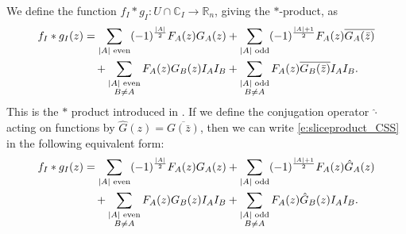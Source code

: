 \documentclass[11pt]{amsart}
\begin{document}
We define the function $f_I * g_I : U \cap \mathbb{C}_I \to \mathbb{R}_n$, giving the $\ast$-product, as
\begin{align}
f_I * g_I(z) &= \sum_{|A| \text{ even}} (-1)^{\frac{|A|}{2}} F_A(z) G_A(z) + \sum_{|A| \text{ odd}} (-1)^{\frac{|A|+1}{2}} F_A(z) \overline{G_A(\bar{z})} \notag \\
&\quad + \sum_{\substack{|A| \text{ even} \\ B \neq A}} F_A(z) G_B(z) I_A I_B + \sum_{\substack{|A| \text{ odd} \\ B \neq A}} F_A(z) \overline{G_B(\bar{z})} I_A I_B.\label{e:sliceproduct_CSS}
\end{align}
This is the $\ast$ product introduced in \cite{MR2684426}.
If we define the conjugation operator $\hat{\cdot}$ acting on functions by
$
\hat{G}(z) = \overline{G(\bar{z})}
$,
then we can write \eqref{e:sliceproduct_CSS} in the following equivalent form:
\begin{align}
f_I * g_I(z) &= \sum_{|A| \text{ even}} (-1)^{\frac{|A|}{2}} F_A(z) G_A(z) + \sum_{|A| \text{ odd}} (-1)^{\frac{|A|+1}{2}} F_A(z) \hat{G}_A(z) \notag \\
&\quad + \sum_{\substack{|A| \text{ even} \\ B \neq A}} F_A(z) G_B(z) I_A I_B + \sum_{\substack{|A| \text{ odd} \\ B \neq A}} F_A(z) \hat{G}_B(z) I_A I_B. \label{e:sliceproduct_CSS2}
\end{align}
\end{document}

